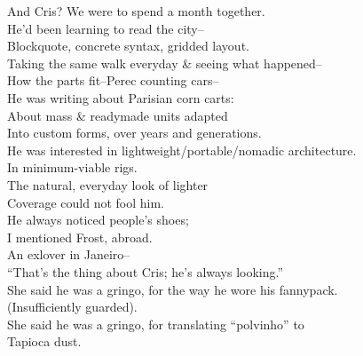 And Cris? We were to spend a month together. \\
He'd been learning to read the city-- \\
Blockquote, concrete syntax, gridded layout. \\
Taking the same walk everyday \& seeing what happened-- \\
How the parts fit--Perec counting cars-- \\
He was writing about Parisian corn carts: \\
About mass \& readymade units adapted \\
Into custom forms, over years and generations. \\
He was interested in lightweight/portable/nomadic architecture. \\
In minimum-viable rigs. \\
The natural, everyday look of lighter \\
Coverage could not fool him. \\
He always noticed people's shoes; \\
I mentioned Frost, abroad. \\
An exlover in Janeiro-- \\
\qquad ``That's the thing about Cris; he's always looking.'' \\
She said he was a gringo, for the way he wore his fannypack. \\
\qquad (Insufficiently guarded). \\
She said he was a gringo, for translating ``polvinho'' to \\
Tapioca dust. \\
